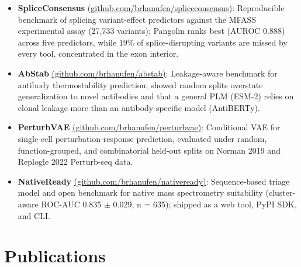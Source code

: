 \documentclass[10pt,a4paper]{article}
\begin{document}
\begin{itemize}[leftmargin=1.2em, topsep=2pt, itemsep=2pt, parsep=0pt]
  \item \textbf{SpliceConsensus} \href{https://github.com/brhanufen/spliceconsensus}{(github.com/brhanufen/spliceconsensus)}: Reproducible benchmark of splicing variant-effect predictors against the MFASS experimental assay (27,733 variants); Pangolin ranks best (AUROC 0.888) across five predictors, while 19\% of splice-disrupting variants are missed by every tool, concentrated in the exon interior.
  \item \textbf{AbStab} \href{https://github.com/brhanufen/abstab}{(github.com/brhanufen/abstab)}: Leakage-aware benchmark for antibody thermostability prediction; showed random splits overstate generalization to novel antibodies and that a general PLM (ESM-2) relies on clonal leakage more than an antibody-specific model (AntiBERTy).
  \item \textbf{PerturbVAE} \href{https://github.com/brhanufen/perturbvae}{(github.com/brhanufen/perturbvae)}: Conditional VAE for single-cell perturbation-response prediction, evaluated under random, function-grouped, and combinatorial held-out splits on Norman 2019 and Replogle 2022 Perturb-seq data.
  \item \textbf{NativeReady} \href{https://github.com/brhanufen/nativeready}{(github.com/brhanufen/nativeready)}: Sequence-based triage model and open benchmark for native mass spectrometry suitability (cluster-aware ROC-AUC 0.835 $\pm$ 0.029, n = 635); shipped as a web tool, PyPI SDK, and CLI.
\end{itemize}

\section{Publications}
\end{document}
